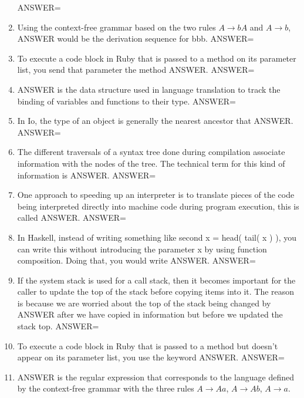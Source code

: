 \documentclass{exam}
\begin{document}
\begin{enumerate}
ANSWER=
\item Using the context-free grammar based on the two rules $A \rightarrow b A$ and $A \rightarrow b$, ANSWER would be the derivation sequence for bbb.\newline
ANSWER=
\item To execute a code block in Ruby that is passed to a method on its parameter list, you send that parameter the method ANSWER.\newline
ANSWER=
\item ANSWER is the data structure used in language translation to track the binding of variables and functions to their type.\newline
ANSWER=
\item In Io, the type of an object is generally the nearest ancestor that ANSWER.\newline
ANSWER=
\item The different traversals of a syntax tree done during compilation associate information with the nodes of the tree.  The technical term for this kind of information is ANSWER.\newline
ANSWER=
\item One approach to speeding up an interpreter is to translate pieces of the code being interpreted directly into machine code during program execution, this is called ANSWER.\newline
ANSWER=
\item In Haskell, instead of writing something like second x = head( tail(  x ) ), you can write this without introducing the parameter x by using function composition.  Doing that, you would write ANSWER.\newline
ANSWER=
\item If the system stack is used for a call stack, then it becomes important for the caller to update the top of the stack before copying items into it.  The reason is because we are worried about the top of the stack being changed by ANSWER after we have copied in information but before we updated the stack top.\newline
ANSWER=
\item To execute a code block in Ruby that is passed to a method but doesn't appear on its parameter list, you use the keyword ANSWER.\newline
ANSWER=
\item ANSWER is the regular expression that corresponds to the language defined by the context-free grammar with the three rules $A \rightarrow A a$, $A \rightarrow A b$, $A \rightarrow a$.\newline

\end{enumerate}
\end{document}
